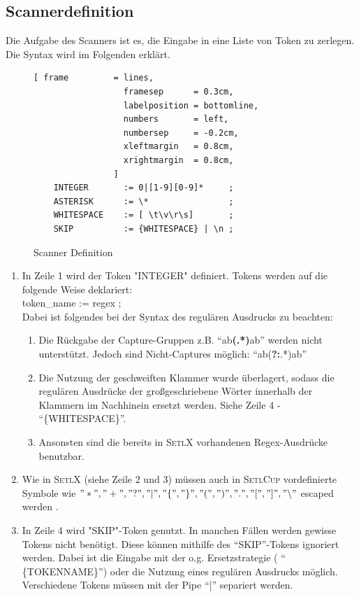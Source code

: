 \subsection{Scannerdefinition}
Die Aufgabe des Scanners ist es, die Eingabe in eine Liste von Token zu zerlegen. Die Syntax wird im Folgenden erklärt.
\begin{figure}[!ht]
\begin{Verbatim}[ frame         = lines, 
                  framesep      = 0.3cm, 
                  labelposition = bottomline,
                  numbers       = left,
                  numbersep     = -0.2cm,
                  xleftmargin   = 0.8cm,
                  xrightmargin  = 0.8cm,
                ]
	INTEGER       := 0|[1-9][0-9]*     ;
	ASTERISK      := \*                ;
	WHITESPACE    := [ \t\v\r\s]       ;
	SKIP          := {WHITESPACE} | \n ;
\end{Verbatim}
\caption{Scanner Definition}
\label{fig:scanner_def}
\end{figure}
\begin{enumerate}
	\item In Zeile 1 wird der Token "INTEGER" definiert. Tokens werden auf die folgende Weise deklariert:\\
					token\_name := regex ; \\
					Dabei ist folgendes bei der Syntax des regulären Ausdrucks zu beachten:
					\begin{enumerate}
						\item Die Rückgabe der Capture-Gruppen z.B. "`ab\textbf{(.*)}ab"'	werden nicht unterstützt. Jedoch sind Nicht-Captures möglich: "`ab(\textbf{?:}.*)ab"'
						\item Die Nutzung der geschweiften Klammer wurde überlagert, sodass die regulären Ausdrücke der großgeschriebene Wörter innerhalb der Klammern im Nachhinein ersetzt werden. Siehe Zeile 4 - "`\{WHITESPACE\}"'.
						\item Ansonsten sind die bereits in \textsc{SetlX} vorhandenen Regex-Ausdrücke benutzbar.
					\end{enumerate}
	\item Wie in \textsc{SetlX} (siehe Zeile 2 und 3) müssen auch in \textsc{SetlCup} vordefinierte Symbole wie $"*","+","?","|","\{","\}","(",")",".","[","]","\backslash"$ escaped werden .
	\item In Zeile 4 wird "SKIP"-Token genutzt. In manchen Fällen werden gewisse Tokens nicht benötigt. Diese können mithilfe des "`SKIP"'-Tokens ignoriert werden. Dabei ist die Eingabe mit der o.g. Ersetzstrategie ( "` \{TOKENNAME\}"') oder die Nutzung eines regulären Ausdrucks möglich. Verschiedene Tokens müssen mit der Pipe "`|"' separiert werden.
\end{enumerate}

